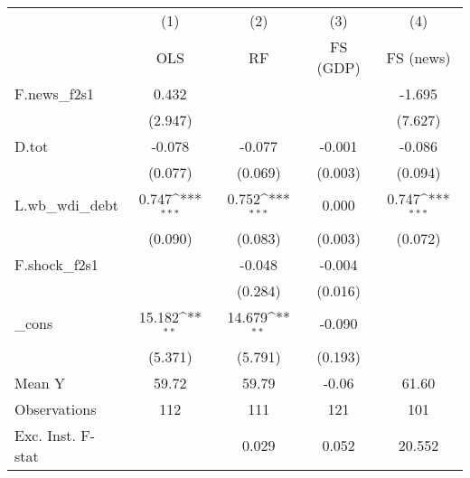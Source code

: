 {
\def\sym#1{\ifmmode^{#1}\else\(^{#1}\)\fi}
\begin{tabular}{l*{4}{c}}
\toprule
            &\multicolumn{1}{c}{(1)}&\multicolumn{1}{c}{(2)}&\multicolumn{1}{c}{(3)}&\multicolumn{1}{c}{(4)}\\
            &\multicolumn{1}{c}{OLS}&\multicolumn{1}{c}{RF}&\multicolumn{1}{c}{FS (GDP)}&\multicolumn{1}{c}{FS (news)}\\
\midrule
F.news\_f2s1 &       0.432         &                     &                     &      -1.695         \\
            &     (2.947)         &                     &                     &     (7.627)         \\
\addlinespace
D.tot       &      -0.078         &      -0.077         &      -0.001         &      -0.086         \\
            &     (0.077)         &     (0.069)         &     (0.003)         &     (0.094)         \\
\addlinespace
L.wb\_wdi\_debt&       0.747\sym{***}&       0.752\sym{***}&       0.000         &       0.747\sym{***}\\
            &     (0.090)         &     (0.083)         &     (0.003)         &     (0.072)         \\
\addlinespace
F.shock\_f2s1&                     &      -0.048         &      -0.004         &                     \\
            &                     &     (0.284)         &     (0.016)         &                     \\
\addlinespace
\_cons      &      15.182\sym{**} &      14.679\sym{**} &      -0.090         &                     \\
            &     (5.371)         &     (5.791)         &     (0.193)         &                     \\
\midrule
Mean Y      &       59.72         &       59.79         &       -0.06         &       61.60         \\
Observations&         112         &         111         &         121         &         101         \\
Exc. Inst. F-stat&                     &       0.029         &       0.052         &      20.552         \\
\bottomrule
\end{tabular}
}
